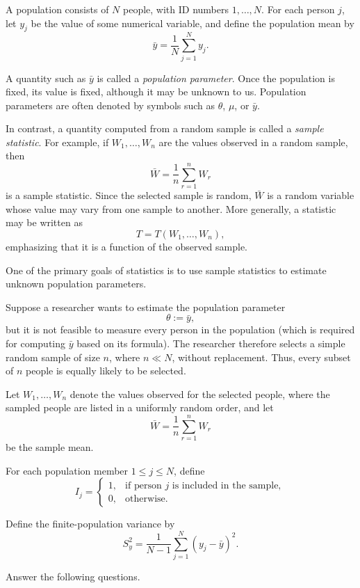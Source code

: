 \documentclass[11pt]{article}
\begin{document}
A population consists of \(N\) people, with ID numbers \(1,\dots,N\). For each
person \(j\), let \(y_j\) be the value of some numerical variable, and define the
population mean by
\[
\bar y=\frac{1}{N}\sum_{j=1}^N y_j.
\]

A quantity such as \(\bar y\) is called a \emph{population parameter}. Once the
population is fixed, its value is fixed, although it may be unknown to us.
Population parameters are often denoted by symbols such as
\(\theta\), \(\mu\), or \(\bar y\).

In contrast, a quantity computed from a random sample is called a
\emph{sample statistic}. For example, if \(W_1,\dots,W_n\) are the values
observed in a random sample, then
\[
\bar W
=
\frac{1}{n}\sum_{r=1}^n W_r
\]
is a sample statistic. Since the selected sample is random, \(\bar W\) is a
random variable whose value may vary from one sample to another. More generally,
a statistic may be written as
\[
T=T(W_1,\dots,W_n),
\]
emphasizing that it is a function of the observed sample.

One of the primary goals of statistics is to use sample statistics to estimate
unknown population parameters.

Suppose a researcher wants to estimate the population parameter
\[
\theta:=\bar y,
\]
but it is not feasible to measure every person in the population (which is required for computing $\bar y$ based on its formula). The researcher
therefore selects a simple random sample of size \(n\), where \(n\ll N\),
without replacement. Thus, every subset of \(n\) people is equally likely to be
selected.

Let \(W_1,\dots,W_n\) denote the values observed for the selected people, where
the sampled people are listed in a uniformly random order, and let
\[
\bar W=\frac{1}{n}\sum_{r=1}^n W_r
\]
be the sample mean.

For each population member \(1\leq j\leq N\), define
\[
I_j=
\begin{cases}
1, & \text{if person \(j\) is included in the sample},\\
0, & \text{otherwise}.
\end{cases}
\]

Define the finite-population variance by
\[
S_y^2
=
\frac{1}{N-1}\sum_{j=1}^N (y_j-\bar y)^2.
\]

Answer the following questions.
\end{document}

